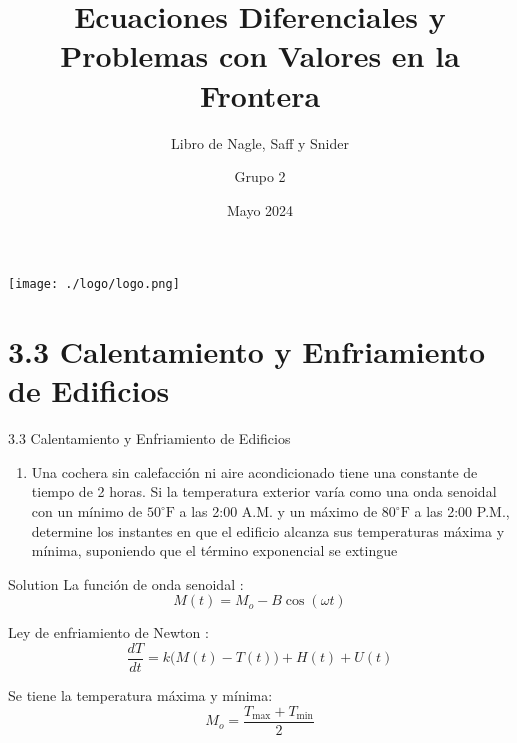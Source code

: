 \documentclass[10 pt]{beamer}
\title[Ecuaciones Diferenciales]{\large{Ecuaciones Diferenciales y Problemas con Valores en la Frontera}}
\subtitle[Libro]{\large{Libro de Nagle, Saff y Snider}}
\author{Grupo 2}
\institute[UNMSM]{
    \Large{Universidad Nacional Mayor de San Marcos} \\
    \vspace{2mm}
    \large{Facultad de Ingeniería de Sistemas e Informática}
    \vspace{2.3cm}
}
\date{Mayo 2024}
\begin{document}
\begin{frame}
    \titlepage
    \vspace*{-3.9cm}
    \begin{center}
        \texttt{[image: ./logo/logo.png]}
    \end{center}
\end{frame}

\section{3.3 Calentamiento y Enfriamiento de Edificios}
\begin{frame}{3.3 Calentamiento y Enfriamiento de Edificios}
    \begin{enumerate}[\footnotesize{8}]
        \item Una cochera sin calefacción ni aire acondicionado tiene una constante de tiempo de 2 horas. Si la temperatura exterior varía como una onda senoidal con un mínimo de $50^\circ \text{F}$ a las 2:00 A.M. y un máximo de $80^\circ \text{F}$ a las 2:00 P.M., determine los instantes en que el edificio alcanza sus temperaturas máxima y mínima, suponiendo que el término exponencial se extingue
    \end{enumerate}

    \begin{block}{Solution}
        La función de onda senoidal :
        \begin{equation}
            M(t) = M_o - B\cos(\omega t)
        \end{equation}

        Ley de enfriamiento de Newton :
        \begin{equation}
            \dfrac{dT}{dt} = k \bigg( M(t) - T(t) \bigg) + H(t) + U(t)
        \end{equation}

        Se tiene la temperatura máxima y mínima:
        \begin{equation}
            M_o = \dfrac{T_{\text{max}} + T_{\text{min}}}{2}
        \end{equation}
    \end{block}
\end{frame}
\end{document}
